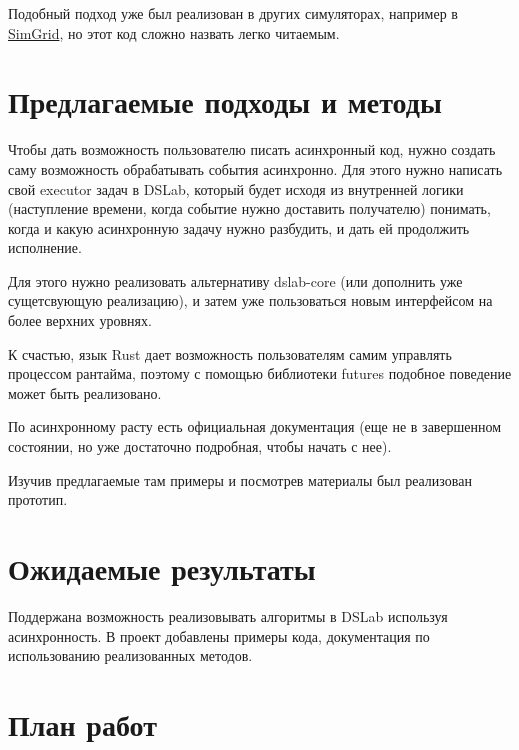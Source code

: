 Подобный подход уже был реализован в других симуляторах, например в \href{https://github.com/osukhoroslov/dslab/blob/main/examples-other/simgrid/ping-pong/process.cpp}
{SimGrid}, но этот код сложно назвать легко читаемым. 

\section{Предлагаемые подходы и методы} 

Чтобы дать возможность пользователю писать асинхронный код, нужно создать саму возможность обрабатывать события асинхронно. Для этого нужно написать свой executor задач в DSLab, который будет исходя из внутренней логики (наступление времени, когда событие нужно доставить получателю) понимать, когда и какую асинхронную задачу нужно разбудить, и дать ей продолжить исполнение. 

Для этого нужно реализовать альтернативу dslab-core (или дополнить уже сущетсвующую реализацию), и затем уже пользоваться новым интерфейсом на более верхних уровнях.

К счастью, язык Rust дает возможность пользователям самим управлять процессом рантайма, поэтому с помощью библиотеки futures подобное поведение может быть реализовано.


По асинхронному расту есть официальная документация (еще не в завершенном состоянии, но уже достаточно подробная, чтобы начать с нее).

Изучив предлагаемые там примеры и посмотрев материалы был реализован прототип.


\section{Ожидаемые результаты}

Поддержана возможность реализовывать алгоритмы в DSLab используя асинхронность. В проект добавлены примеры кода, документация по использованию реализованных методов.

\section{План работ}

